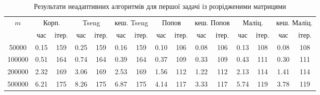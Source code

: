 \begin{table}[H]
    \centering
    \begin{tabular}{||c||c|c||c|c|c|c||c|c|c|c||c|c|c|c||} \hline \hline
        \multirow{2}{*}{$m$} & \multicolumn{2}{c||}{Корп.} & \multicolumn{2}{c|}{Tseng} & \multicolumn{2}{c||}{кеш. Tseng} & \multicolumn{2}{c|}{Попов} & \multicolumn{2}{c||}{кеш. Попов} & \multicolumn{2}{c|}{Маліц.} & \multicolumn{2}{c||}{кеш. Маліц.} \\ \cline{2-15}
         & час & ітер. & час & ітер. & час & ітер. & час & ітер. & час & ітер. & час & ітер. & час & ітер. \\ \hline \hline
        50000 & 0.15 & 159 & 0.25 & 159 & 0.16 & 159 & 0.10 & 106 & 0.08 & 106 & 0.13 & 108 & 0.08 & 108 \\ \hline
        100000 & 0.51 & 164 & 0.74 & 164 & 0.39 & 164 & 0.37 & 109 & 0.33 & 109 & 0.43 & 111 & 0.30 & 111 \\ \hline
        200000 & 2.32 & 169 & 3.06 & 169 & 2.53 & 169 & 1.56 & 112 & 1.22 & 112 & 2.13 & 114 & 1.41 & 114 \\ \hline
        500000 & 6.21 & 175 & 8.26 & 175 & 6.87 & 175 & 4.14 & 117 & 3.33 & 117 & 5.74 & 119 & 3.78 & 119 \\ \hline
        \hline
    \end{tabular}
    \caption{Результати неадаптивних алгоритмів для першої задачі із розрідженими матрицями}
    \label{tab:1-sparse}
\end{table}
